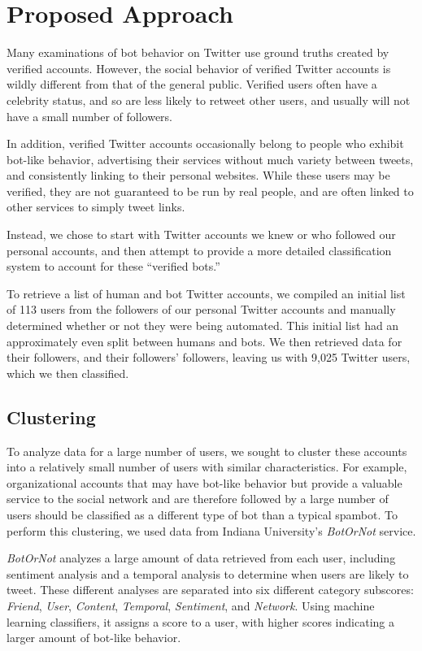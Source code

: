 \documentclass{sig-alternate-05-2015}
\begin{document}
\section{Proposed Approach}
Many examinations of bot behavior on Twitter use ground truths created by verified accounts. However, the social behavior of verified Twitter accounts is wildly different from that of the general public. Verified users often have a celebrity status, and so are less likely to retweet other users, and usually will not have a small number of followers.

In addition, verified Twitter accounts occasionally belong to people who exhibit bot-like behavior, advertising their services without much variety between tweets, and consistently linking to their personal websites. While these users may be verified, they are not guaranteed to be run by real people, and are often linked to other services to simply tweet links.

Instead, we chose to start with Twitter accounts we knew or who followed our personal accounts, and then attempt to provide a more detailed classification system to account for these ``verified bots.''

To retrieve a list of human and bot Twitter accounts, we compiled an initial list of 113 users from the followers of our personal Twitter accounts and manually determined whether or not they were being automated. This initial list had an approximately even split between humans and bots. We then retrieved data for their followers, and their followers' followers, leaving us with 9,025 Twitter users, which we then classified.

\subsection{Clustering}

To analyze data for a large number of users, we sought to cluster these accounts into a relatively small number of users with similar characteristics. For example, organizational accounts that may have bot-like behavior but provide a valuable service to the social network and are therefore followed by a large number of users should be classified as a different type of bot than a typical spambot. To perform this clustering, we used data from Indiana University's \emph{BotOrNot} service.

\emph{BotOrNot} analyzes a large amount of data retrieved from each user, including sentiment analysis and a temporal analysis to determine when users are likely to tweet. These different analyses are separated into six different category subscores: \emph{Friend}, \emph{User}, \emph{Content}, \emph{Temporal}, \emph{Sentiment}, and \emph{Network}\cite{Davis:BotOrNot}. Using machine learning classifiers, it assigns a score to a user, with higher scores indicating a larger amount of bot-like behavior.
\end{document}
